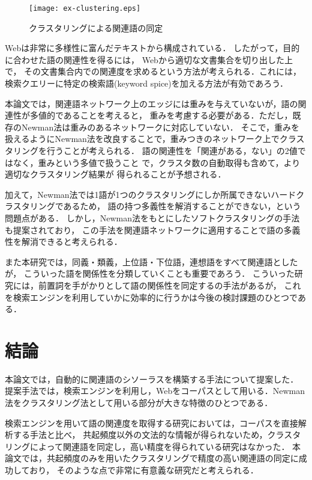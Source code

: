 \documentclass[japanese]{jnlp_1.3a}
\begin{document}
\begin{figure}[b]
 \begin{center}
  \texttt{[image: ex-clustering.eps]}
 \end{center}
 \caption{クラスタリングによる関連語の同定}
  \label{ex-clustering}
\end{figure}


Webは非常に多様性に富んだテキストから構成されている．
したがって，目的に合わせた語の関連性を得るには，
Webから適切な文書集合を切り出した上で，
その文書集合内での関連度を求めるという方法が考えられる．これには，
検索クエリーに特定の検索語(keyword spice)を加える方法が有効であろう\cite{Oyama04}．


本論文では，関連語ネットワーク上のエッジには重みを与えていないが，語の関連性が多値的であることを考えると，
重みを考慮する必要がある．ただし，既存のNewman法は重みのあるネットワークに対応していない．
そこで，重みを扱えるようにNewman法を改良することで，重みつきのネットワーク上でクラスタリングを行うことが考えられる．
語の関連性を「関連がある，ない」の2値ではなく，重みという多値で扱うこと
で，クラスタ数の自動取得も含めて，より適切なクラスタリング結果が
得られることが予想される．


加えて，Newman法では1語が1つのクラスタリングにしか所属できないハードクラスタリングであるため，
語の持つ多義性を解消することができない，という問題点がある．
しかし，Newman法をもとにしたソフトクラスタリングの手法も提案されており\cite{Reichard04}，
この手法を関連語ネットワークに適用することで語の多義性を解消できると考えられる．


また本研究では，同義・類義，上位語・下位語，連想語をすべて関連語としたが，
こういった語を関係性を分類していくことも重要であろう．
こういった研究には，前置詞を手がかりとして語の関係性を同定する\cite{Litkowski02}の手法があるが，
これを検索エンジンを利用していかに効率的に行うかは今後の検討課題のひとつである．



\section{結論}

本論文では，自動的に関連語のシソーラスを構築する手法について提案した．
提案手法では，検索エンジンを利用し，Webをコーパスとして用いる．Newman法をクラスタリング法として用いる部分が大きな特徴のひとつである．

検索エンジンを用いて語の関連度を取得する研究においては，コーパスを直接解析する手法と比べ，
共起頻度以外の文法的な情報が得られないため，クラスタリングによって関連語を同定し，高い精度を得られている研究はなかった．
本論文では，共起頻度のみを用いたクラスタリングで精度の高い関連語の同定に成功しており，
そのような点で非常に有意義な研究だと考えられる．
\end{document}
